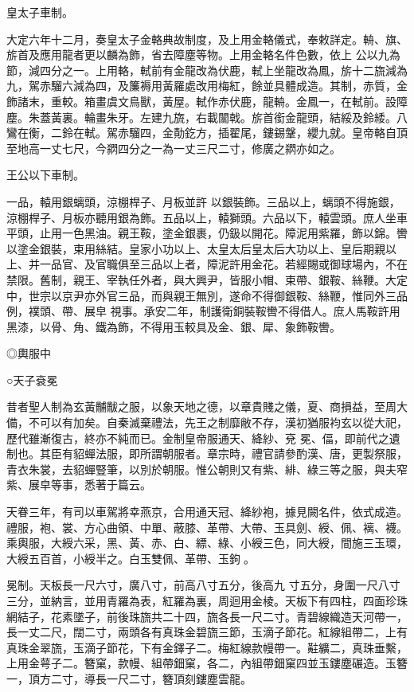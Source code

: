 \begin{pinyinscope}
 皇太子車制。



 大定六年十二月，奏皇太子金輅典故制度，及上用金輅儀式，奉敕詳定。輈、旗、旂首及應用龍者更以麟為飾，省去障塵等物。上用金輅名件色數，依上
 公以九為節，減四分之一。上用輅，軾前有金龍改為伏鹿，軾上坐龍改為鳳，旂十二旒減為九，駕赤騮六減為四，及簾褥用黃羅處改用梅紅，餘並具體成造。其制，赤質，金飾諸末，重較。箱畫虞文鳥獸，黃屋。軾作赤伏鹿，龍輈。金鳳一，在軾前。設障塵。朱蓋黃裏。輪畫朱牙。左建九旒，右載闟戟。旂首銜金龍頭，結綏及鈴緌。八鸞在衡，二鈴在軾。駕赤騮四，金勣釳方，插翟尾，鏤錫鞶，纓九就。皇帝輅自頂至地高一丈七尺，今閷四分之一為一丈三尺二寸，修廣之閷亦如之。



 王公以下車制。



 一品，轅用銀螭頭，涼棚桿子、月板並許
 以銀裝飾。三品以上，螭頭不得施銀，涼棚桿子、月板亦聽用銀為飾。五品以上，轅獅頭。六品以下，轅雲頭。庶人坐車平頭，止用一色黑油。親王鞍，塗金銀裹，仍鈒以開花。障泥用紫羅，飾以錦。轡以塗金銀裝，束用絲結。皇家小功以上、太皇太后皇太后大功以上、皇后期親以上、并一品官、及官職俱至三品以上者，障泥許用金花。若經賜或御球場內，不在禁限。舊制，親王、宰執任外者，與大興尹，皆服小帽、束帶、銀鞍、絲鞭。大定中，世宗以京尹亦外官三品，而與親王無別，遂命不得御銀鞍、絲鞭，惟同外三品例，襆頭、帶、展皁
 視事。承安二年，制護衛銅裝鞍轡不得借人。庶人馬鞍許用黑漆，以骨、角、鐵為飾，不得用玉較具及金、銀、犀、象飾鞍轡。



 ◎輿服中



 ○天子袞冕



 昔者聖人制為玄黃黼黻之服，以象天地之德，以章貴賤之儀，夏、商損益，至周大備，不可以有加矣。自秦滅棄禮法，先王之制靡敝不存，漢初猶服袀玄以從大祀，歷代雖漸復古，終亦不純而已。金制皇帝服通天、絳紗、兗
 冕、偪，即前代之遺制也。其臣有貂蟬法服，即所謂朝服者。章宗時，禮官請參酌漢、唐，更製祭服，青衣朱裳，去貂蟬豎筆，以別於朝服。惟公朝則又有紫、緋、綠三等之服，與夫窄紫、展皁等事，悉著于篇云。



 天眷三年，有司以車駕將幸燕京，合用通天冠、絳紗袍，據見闕名件，依式成造。禮服，袍、裳、方心曲領、中單、蔽膝、革帶、大帶、玉具劍、綬、佩、褵、襪。乘輿服，大綬六采，黑、黃、赤、白、縹、綠、小綬三色，同大綬，間施三玉環，大綬五百首，小綬半之。白玉雙佩、革帶、玉鉤。



 冕制。天板長一尺六寸，廣八寸，前高八寸五分，後高九
 寸五分，身圍一尺八寸三分，並納言，並用青羅為表，紅羅為裏，周迴用金棱。天板下有四柱，四面珍珠網結子，花素墜子，前後珠旒共二十四，旒各長一尺二寸。青碧線織造天河帶一，長一丈二尺，闊二寸，兩頭各有真珠金碧旒三節，玉滴子節花。紅線組帶二，上有真珠金翠旒，玉滴子節花，下有金鐸子二。梅紅線款幔帶一。黈纊二，真珠垂繫，上用金萼子二。簪窠，款幔、組帶鈿窠，各二，內組帶鈿窠四並玉鏤塵碾造。玉簪一，頂方二寸，導長一尺二寸，簪頂刻鏤塵雲龍。




\end{pinyinscope}
